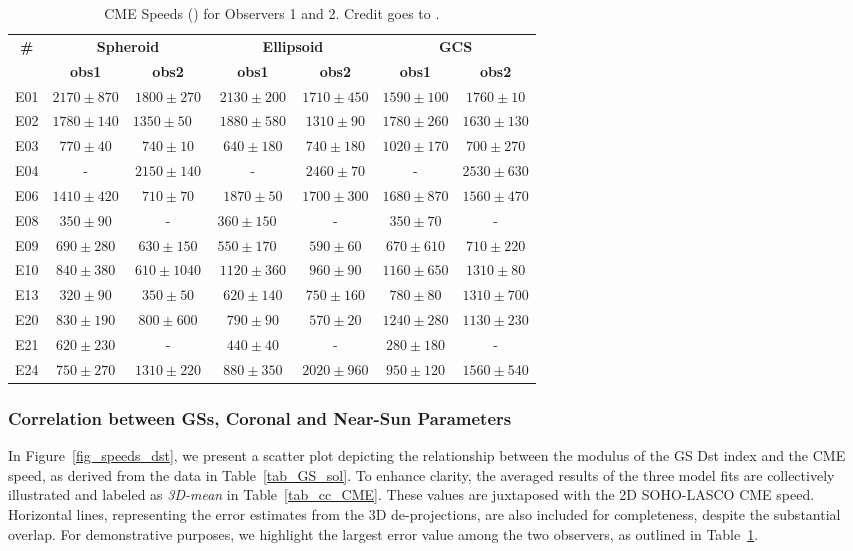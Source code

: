 \begin{table}[!htp]
	\caption{CME Speeds (\kms) for Observers 1 and 2. Credit goes to \citet{miteva_2023}.}
	\label{tab_fits}
	\centering
	\begin{tabular}{ccccccc}
		\toprule
		\textbf{\#} & \multicolumn{2}{c}{\textbf{Spheroid}} & \multicolumn{2}{c}{\textbf{Ellipsoid}} & \multicolumn{2}{c}{\textbf{GCS}} \\
		& \textbf{obs1} & \textbf{obs2} & \textbf{obs1} & \textbf{obs2} & \textbf{obs1} & \textbf{obs2} \\
		\midrule
		E01 & $2170\pm870$ & $1800\pm270$ & $2130\pm200$ & $1710\pm450$ & $1590\pm100$ & $1760\pm10$ \\
		E02 & $1780\pm140$ & $1350\pm50$  & $1880\pm580$ & $1310\pm90$ & $1780\pm260$ & $1630\pm130$ \\
		E03 & $770\pm40$ & $740\pm10$ & $640\pm180$ & $740\pm180$ & $1020\pm170$ & $700\pm270$ \\
		E04 & - & $2150\pm140$ & - & $2460\pm70$ & - & $2530\pm630$ \\
		E06 & $1410\pm420$ & $710\pm70$ & $1870\pm50$ & $1700\pm300$ & $1680\pm870$ & $1560\pm470$ \\
		E08 & $350\pm90$ & - & $360\pm150$  & - & $350\pm70$ & - \\
		E09 & $690\pm280$ & $630\pm150$ & $550\pm170$  & $590\pm60$ & $670\pm610$ & $710\pm220$ \\
		E10 & $840\pm380$ & $610\pm1040$ & $1120\pm360$ & $960\pm90$ & $1160\pm650$ & $1310\pm80$ \\
		E13 & $320\pm90$ & $350\pm50$ & $620\pm140$ & $750\pm160$ & $780\pm80$ & $1310\pm700$ \\
		E20 & $830\pm190$ & $800\pm600$ & $790\pm90$ & $570\pm20$ & $1240\pm280$ & $1130\pm230$ \\
		E21 & $620\pm230$ & - & $440\pm40$ & - & $280\pm180$ & - \\
		E24 & $750\pm270$ & $1310\pm220$ & $880\pm350$ & $2020\pm960$ & $950\pm120$ & $1560\pm540$ \\
		\bottomrule
	\end{tabular}
\end{table}

\subsubsection{Correlation between GSs, Coronal and Near-Sun Parameters}
In Figure~\ref{fig_speeds_dst}, we present a scatter plot depicting the relationship between the modulus of the GS Dst index and the CME speed, as derived from the data in Table~\ref{tab_GS_sol}. To enhance clarity, the averaged results of the three model fits are collectively illustrated and labeled as \textit{3D-mean} in Table~\ref{tab_cc_CME}. These values are juxtaposed with the 2D SOHO-LASCO CME speed. Horizontal lines, representing the error estimates from the 3D de-projections, are also included for completeness, despite the substantial overlap. For demonstrative purposes, we highlight the largest error value among the two observers, as outlined in Table~\ref{tab_fits}.

